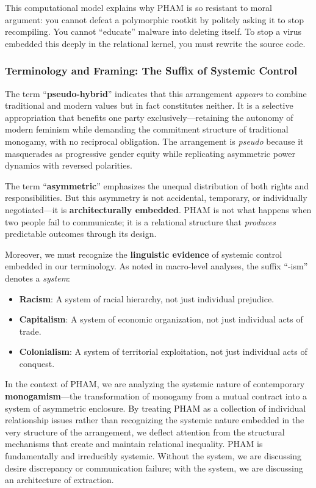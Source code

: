 \documentclass[12pt, letterpaper]{article}
\begin{document}
This computational model explains why PHAM is so resistant to moral argument: you cannot defeat a polymorphic rootkit by politely asking it to stop recompiling. You cannot ``educate'' malware into deleting itself. To stop a virus embedded this deeply in the relational kernel, you must rewrite the source code.

\subsubsection{Terminology and Framing: The Suffix of Systemic Control}

The term ``\textbf{pseudo-hybrid}'' indicates that this arrangement \textit{appears} to combine traditional and modern values but in fact constitutes neither. It is a selective appropriation that benefits one party exclusively---retaining the autonomy of modern feminism while demanding the commitment structure of traditional monogamy, with no reciprocal obligation. The arrangement is \textit{pseudo} because it masquerades as progressive gender equity while replicating asymmetric power dynamics with reversed polarities.

The term ``\textbf{asymmetric}'' emphasizes the unequal distribution of both rights and responsibilities. But this asymmetry is not accidental, temporary, or individually negotiated---it is \textbf{architecturally embedded}. PHAM is not what happens when two people fail to communicate; it is a relational structure that \textit{produces} predictable outcomes through its design.

Moreover, we must recognize the \textbf{linguistic evidence} of systemic control embedded in our terminology. As noted in macro-level analyses, the suffix ``-ism'' denotes a \textit{system}:
\begin{itemize}
    \item \textbf{Racism}: A system of racial hierarchy, not just individual prejudice.
    \item \textbf{Capitalism}: A system of economic organization, not just individual acts of trade.
    \item \textbf{Colonialism}: A system of territorial exploitation, not just individual acts of conquest.
\end{itemize}

In the context of PHAM, we are analyzing the systemic nature of contemporary \textbf{monogamism}---the transformation of monogamy from a mutual contract into a system of asymmetric enclosure. By treating PHAM as a collection of individual relationship issues rather than recognizing the systemic nature embedded in the very structure of the arrangement, we deflect attention from the structural mechanisms that create and maintain relational inequality. PHAM is fundamentally and irreducibly systemic. Without the system, we are discussing desire discrepancy or communication failure; with the system, we are discussing an architecture of extraction.
\end{document}
